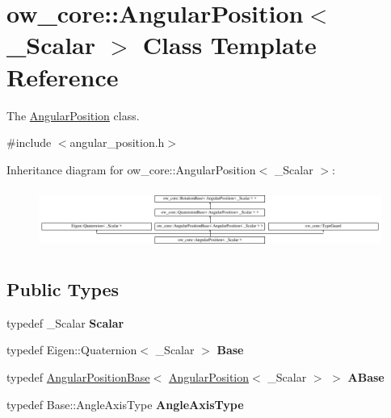 \hypertarget{classow__core_1_1AngularPosition}{}\section{ow\+\_\+core\+:\+:Angular\+Position$<$ \+\_\+\+Scalar $>$ Class Template Reference}
\label{classow__core_1_1AngularPosition}


The \hyperlink{classow__core_1_1AngularPosition}{Angular\+Position} class.  




{\ttfamily \#include $<$angular\+\_\+position.\+h$>$}

Inheritance diagram for ow\+\_\+core\+:\+:Angular\+Position$<$ \+\_\+\+Scalar $>$\+:\begin{figure}[H]
\begin{center}
\leavevmode
\includegraphics[height=2.001787cm]{d8/d16/classow__core_1_1AngularPosition}
\end{center}
\end{figure}
\subsection*{Public Types}
\begin{DoxyCompactItemize}
\item 
typedef \+\_\+\+Scalar {\bfseries Scalar}\hypertarget{classow__core_1_1AngularPosition_a115f32aed8be3c9a1ae111c7c1a963ff}{}\label{classow__core_1_1AngularPosition_a115f32aed8be3c9a1ae111c7c1a963ff}

\item 
typedef Eigen\+::\+Quaternion$<$ \+\_\+\+Scalar $>$ {\bfseries Base}\hypertarget{classow__core_1_1AngularPosition_ad7b0d86900fc6fcbdbba938d9d09dcf7}{}\label{classow__core_1_1AngularPosition_ad7b0d86900fc6fcbdbba938d9d09dcf7}

\item 
typedef \hyperlink{classow__core_1_1AngularPositionBase}{Angular\+Position\+Base}$<$ \hyperlink{classow__core_1_1AngularPosition}{Angular\+Position}$<$ \+\_\+\+Scalar $>$ $>$ {\bfseries A\+Base}\hypertarget{classow__core_1_1AngularPosition_aeeeb6c2408dea59173f26dc80248f623}{}\label{classow__core_1_1AngularPosition_aeeeb6c2408dea59173f26dc80248f623}

\item 
typedef Base\+::\+Angle\+Axis\+Type {\bfseries Angle\+Axis\+Type}\hypertarget{classow__core_1_1AngularPosition_a1fe688b0fa7cea959d720a1339242a2b}{}\label{classow__core_1_1AngularPosition_a1fe688b0fa7cea959d720a1339242a2b}

\end{DoxyCompactItemize}
